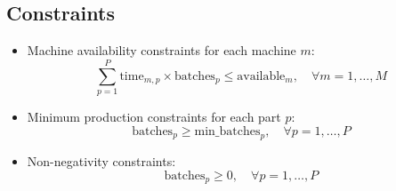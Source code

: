 \documentclass{article}
\begin{document}
\subsection*{Constraints}
\begin{itemize}
    \item Machine availability constraints for each machine \( m \):
    \[
    \sum_{p=1}^{P} \text{time}_{m,p} \times \text{batches}_{p} \leq \text{available}_{m}, \quad \forall m = 1, \ldots, M
    \]
    \item Minimum production constraints for each part \( p \):
    \[
    \text{batches}_{p} \geq \text{min\_batches}_{p}, \quad \forall p = 1, \ldots, P
    \]
    \item Non-negativity constraints:
    \[
    \text{batches}_{p} \geq 0, \quad \forall p = 1, \ldots, P
    \]
\end{itemize}
\end{document}
